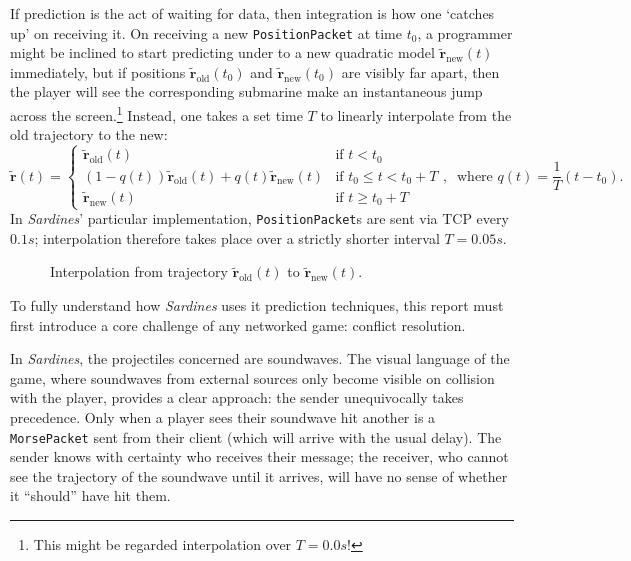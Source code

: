 \documentclass[a4paper, 10pt]{article}
\begin{document}
\begin{flushleft}
\vspace{5pt}\noindent
If prediction is the act of waiting for data, then integration is how one `catches up' on receiving it. On receiving a new \texttt{PositionPacket} at time $t_0$, a programmer might be inclined to start predicting under to a new quadratic model $\mathbf{\tilde{r}}_{\textrm{new}}(t)$ immediately, but if positions $\mathbf{\tilde{r}}_{\textrm{old}}(t_0)$ and $\mathbf{\tilde{r}}_{\textrm{new}}(t_0)$ are visibly far apart, then the player will see the corresponding submarine make an instantaneous jump across the screen.\footnote{This might be regarded interpolation over $T = 0.0s$!} Instead, one takes a set time $T$ to linearly interpolate from the old trajectory to the new:
$$\mathbf{\tilde{r}}(t) = \begin{cases} 
\mathbf{\tilde{r}}_{\textrm{old}}(t) & \textrm{if $t < t_0$} \\
(1-q(t))\mathbf{\tilde{r}}_{\textrm{old}}(t) + q(t)\mathbf{\tilde{r}}_{\textrm{new}}(t) & \textrm{if $t_0 \leq t < t_0+T$} \\
\mathbf{\tilde{r}}_{\textrm{new}}(t) & \textrm{if $t \geq t_0+T$}
\end{cases}, \;\; \textrm{where $q(t) = \frac{1}{T}\left(t-t_0\right)$.}$$
In \textit{Sardines}' particular implementation, \texttt{PositionPacket}s are sent via TCP every $0.1s$; interpolation therefore takes place over a strictly shorter interval $T = 0.05s$. 


\begin{figure}[h]
\centering
\caption{Interpolation from trajectory $\mathbf{\tilde{r}}_{\textrm{old}}(t)$ to $\mathbf{\tilde{r}}_{\textrm{new}}(t)$.}
\label{Interpolation}
\end{figure}

\vspace{5pt}\noindent
To fully understand how \textit{Sardines} uses it prediction techniques, this report must first introduce a core challenge of any networked game: conflict resolution.

\vspace{5pt}\noindent
In \textit{Sardines}, the projectiles concerned are soundwaves. The visual language of the game, where soundwaves from external sources only become visible on collision with the player, provides a clear approach: the sender unequivocally takes precedence. Only when a player sees their soundwave hit another is a \texttt{MorsePacket} sent from their client (which will arrive with the usual delay). The sender knows with certainty who receives their message; the receiver, who cannot see the trajectory of the soundwave until it arrives, will have no sense of whether it ``should'' have hit them.


\end{flushleft}
\end{document}
